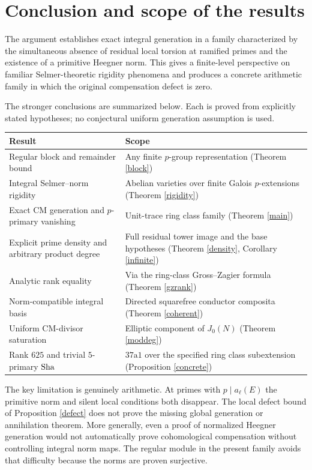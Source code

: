 \documentclass[11pt,a4paper]{article}
\numberwithin{equation}{section}
\begin{document}
\section{Conclusion and scope of the results}
The argument establishes exact integral generation in a family characterized by the simultaneous absence of residual local torsion at ramified primes and the existence of a primitive Heegner norm. This gives a finite-level perspective on familiar Selmer-theoretic rigidity phenomena and produces a concrete arithmetic family in which the original compensation defect is zero.

The stronger conclusions are summarized below. Each is proved from explicitly stated hypotheses; no conjectural uniform generation assumption is used.
\begin{center}
\begin{tabular}{@{}p{}p{}@{}}
\toprule
Result&Scope\\\midrule
Regular block and remainder bound & Any finite $p$-group representation (Theorem \ref{block})\\[2pt]
Integral Selmer--norm rigidity & Abelian varieties over finite Galois $p$-extensions (Theorem \ref{rigidity})\\[2pt]
Exact CM generation and $p$-primary vanishing & Unit-trace ring class family (Theorem \ref{main})\\[2pt]
Explicit prime density and arbitrary product degree & Full residual tower image and the base hypotheses (Theorem \ref{density}, Corollary \ref{infinite})\\[2pt]
Analytic rank equality & Via the ring-class Gross--Zagier formula (Theorem \ref{gzrank})\\[2pt]
Norm-compatible integral basis & Directed squarefree conductor composita (Theorem \ref{coherent})\\[2pt]
Uniform CM-divisor saturation & Elliptic component of $J_0(N)$ (Theorem \ref{moddeg})\\[2pt]
Rank $625$ and trivial $5$-primary $\operatorname{Sha}$ & $37\mathrm{a}1$ over the specified ring class subextension (Proposition \ref{concrete})\\
\bottomrule
\end{tabular}
\end{center}
The key limitation is genuinely arithmetic. At primes with $p\mid a_\ell(E)$ the primitive norm and silent local conditions both disappear. The local defect bound of Proposition \ref{defect} does not prove the missing global generation or annihilation theorem. More generally, even a proof of normalized Heegner generation would not automatically prove cohomological compensation without controlling integral norm maps. The regular module in the present family avoids that difficulty because the norms are proven surjective.
\end{document}
